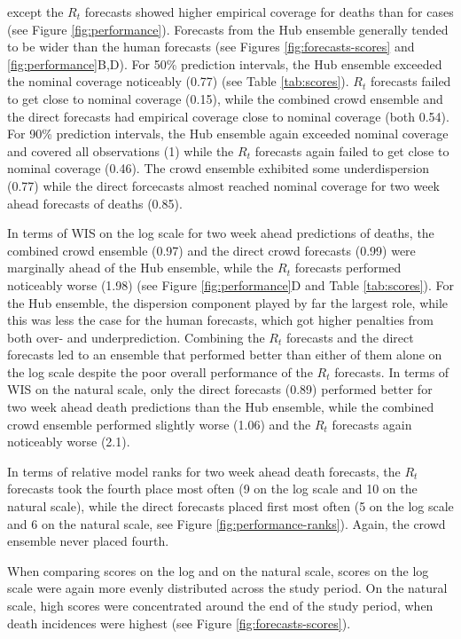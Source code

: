 \documentclass[10pt,a4paper,twocolumn]{article}
\providecommand{\DIFaddtex}[1]{{\protect\color{blue}\uwave{#1}}} %
\providecommand{\DIFaddend}{} %
\providecommand{\DIFadd}[1]{\texorpdfstring{\DIFaddtex{#1}}{#1}} %
\begin{document}
\DIFadd{All forecasting approaches }\DIFaddend except the $R_t$ forecasts showed higher empirical coverage for deaths than for cases (see Figure \ref{fig:performance}). Forecasts from the Hub ensemble generally tended to be wider than the human forecasts (see Figures \ref{fig:forecasts-scores} and \ref{fig:performance}B,D). For 50\% prediction intervals, the Hub ensemble exceeded the nominal coverage noticeably (0.77) (see Table \ref{tab:scores}). $R_t$ forecasts failed to get close to nominal coverage (0.15), while the combined crowd ensemble and the direct forecasts had empirical coverage close to nominal coverage (both 0.54). For 90\% prediction intervals, the Hub ensemble again exceeded nominal coverage and covered all observations (1) while the $R_t$ forecasts again failed to get close to nominal coverage (0.46). The crowd ensemble exhibited some underdispersion (0.77) while the direct forcecasts almost reached nominal coverage for two week ahead forecasts of deaths (0.85). 

In terms of WIS on the log scale for two week ahead predictions of deaths, the combined crowd ensemble (0.97) and the direct crowd forecasts (0.99) were marginally ahead of the Hub ensemble, while the $R_t$ forecasts performed noticeably worse (1.98) (see Figure \ref{fig:performance}D and Table \ref{tab:scores}). For the Hub ensemble, the dispersion component played by far the largest role, while this was less the case for the human forecasts, which got higher penalties from both over- and underprediction. Combining the $R_t$ forecasts and the direct forecasts led to an ensemble that performed better than either of them alone on the log scale despite the poor overall performance of the $R_t$ forecasts. 
In terms of WIS on the natural scale, only the direct forecasts (0.89) performed better for two week ahead death predictions than the Hub ensemble, while the combined crowd ensemble performed slightly worse (1.06) and the $R_t$ forecasts again noticeably worse (2.1). 

In terms of relative model ranks for two week ahead death forecasts, the $R_t$ forecasts took the fourth place most often (9 on the log scale and 10 on the natural scale), while the direct forecasts placed first most often (5 on the log scale and 6 on the natural scale, see Figure \ref{fig:performance-ranks}). Again, the crowd ensemble never placed fourth.  

When comparing scores on the log and on the natural scale, scores on the log scale were again more evenly distributed across the study period. On the natural scale, high scores were concentrated around the end of the study period, when death incidences were highest (see Figure \ref{fig:forecasts-scores}). 
\end{document}
